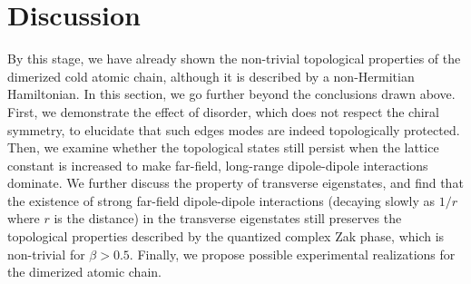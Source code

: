\documentclass[aps,pra,reprint,groupedaddress,nofootinbib,longbibliography,showpacs]{revtex4-1}
\begin{document}
 
\section{Discussion}
By this stage, we have already shown the non-trivial topological properties of the dimerized cold atomic chain, although it is described by a non-Hermitian Hamiltonian. In this section, we go further beyond the conclusions drawn above. First, we demonstrate the effect of disorder, which does not respect the chiral symmetry, to elucidate that such edges modes are indeed topologically protected. Then, we examine whether the topological states still persist when the lattice constant is increased to make far-field, long-range dipole-dipole interactions dominate. We further discuss the property of transverse eigenstates, and find that the existence of strong far-field dipole-dipole interactions (decaying slowly as $1/r$ where $r$ is the distance) in the transverse eigenstates still preserves the topological properties described by the quantized complex Zak phase, which is non-trivial for $\beta>0.5$. Finally, we propose possible experimental realizations for the dimerized atomic chain. 
\end{document}
